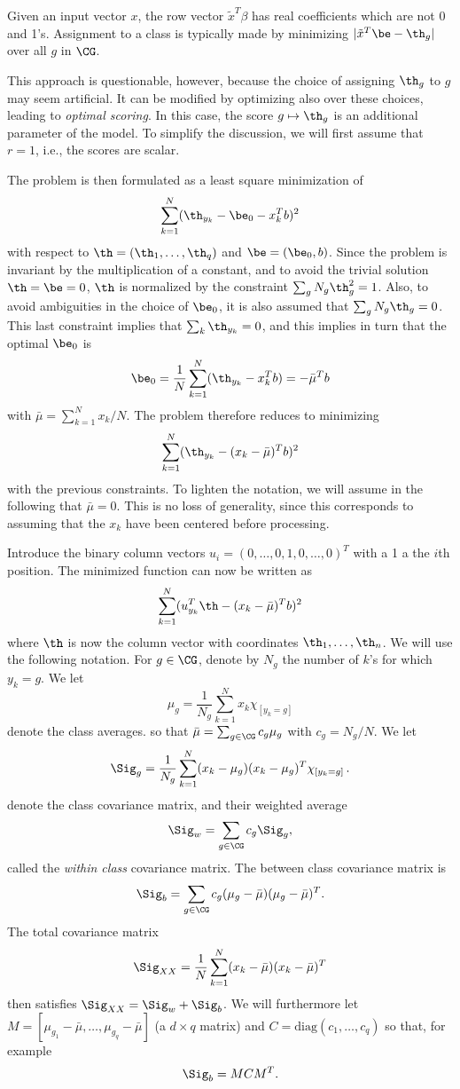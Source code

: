 Given an input vector $x$, the row vector $\tilde x^T\beta$ has
real coefficients which are not $0$ and 1's. Assignment to a class is typically  
made by minimizing $|\tilde x^T \be - \th_{g}|$ over all
$g$ in $\CG$.

This approach is questionable, however, because the choice of
assigning $\th_g$ to $g$ may seem artificial. It can be modified by optimizing also over these choices, leading to {\em optimal scoring}.
In this case, the score  $g\mapsto \th_g$ is an additional parameter of the model. To simplify the discussion, we will first assume that $r=1$, i.e., the scores are scalar.

The problem is
then formulated as a least square minimization of
$$
\sum_{k=1}^N (\th_{y_k} - \be_0 - x_k^T b)^2
$$
with respect to $\th = (\th_1, \ldots, \th_q)$ and $\be = (\be_0, b)$. Since the problem is
invariant by the multiplication of a constant, and to avoid the
trivial solution $\th=\be=0$, $\th$ is normalized by the constraint
$\sum_g N_g \th_g^2 = 1$. Also, to avoid ambiguities in the choice of
$\be_0$, it is also assumed that $\sum_g N_g \th_g=0$. This last
constraint implies that $\sum_k \th_{y_k} = 0$, and this implies in
turn that the optimal $\be_0$ is 
$$
\be_0 = \frac{1}{N} \sum_{k=1}^N (\th_{y_k} - x_k^Tb) = -\bar\mu^Tb
$$
with $\bar \mu = \sum_{k=1}^N x_k /N$.
The problem therefore reduces to minimizing
$$
\sum_{k=1}^N (\th_{y_k} - (x_k-\bar\mu)^T b)^2
$$
with the previous constraints. To lighten the notation, we will assume
in the following that $\bar\mu = 0$. This is no loss of generality, since
this corresponds to assuming that the $x_k$ have been centered before processing.


Introduce the binary column vectors $u_{i} = (0, \ldots,
0,1,0, \ldots, 0)^T$ with a 1 a the $i$th position.  The minimized function can now be written as
$$
\sum_{k=1}^N (u_{y_k}^T\th - (x_k-\bar\mu)^T b)^2
$$
where $\th$ is now the column vector with coordinates $\th_1, \ldots,
\th_n$. We will use the following notation. For $g\in\CG$, denote by $N_g$ the
number of $k$'s for which $y_k = g$. We let
$$
\mu_g = \frac{1}{N_g} \sum_{k=1}^N x_k \chi_{[y_k = g]}
$$
denote the class averages. so that $\bar\mu = \sum_{g\in \CG} c_g \mu_g$ with $c_g = N_g/N$. 
We let
$$
\Sig_g = \frac{1}{N_g} \sum_{k=1}^N (x_k - \mu_{g})(x_k - \mu_{g})^T\chi_{[y_k=g]}\,.
$$
denote the class covariance matrix, and their weighted average
\[
\Sig_w = \sum_{g\in\CG} c_g\Sig_g,
\]
called the {\em within class} covariance matrix. The between class covariance matrix is
\[
\Sig_b = \sum_{g\in\CG} c_g (\mu_g- \bar\mu)(\mu_g- \bar\mu)^T.
\]
The total covariance matrix
\[
\Sig_{XX} = \frac{1}{N}\sum_{k=1}^N (x_k-\bar\mu) (x_k - \bar\mu)^T
\]
then satisfies $\Sig_{XX} = \Sig_w + \Sig_b$.
We will furthermore let $M = [\mu_{g_1}-\bar\mu, \ldots, \mu_{g_q}-\bar\mu]$ (a $d\times q$ matrix) and $C = \mathrm{diag}(c_1, \ldots, c_q)$ so that, for example
\[
\Sig_b  = MCM^T.
\]

